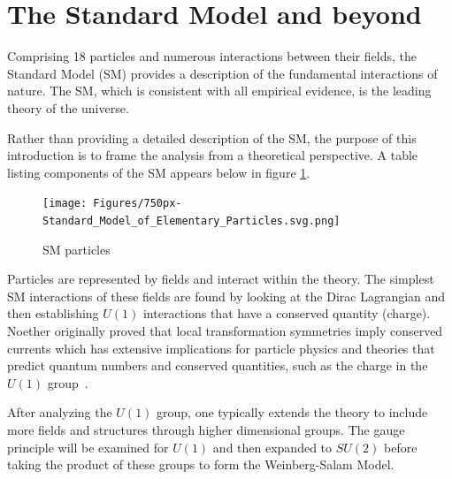\section{The Standard Model and beyond}




Comprising 18 particles and numerous interactions between their fields, the Standard Model (SM) provides a description of the fundamental interactions of nature.
The SM, which is consistent with all empirical evidence, is the leading theory of the universe. 


Rather than providing a detailed description of the SM, the purpose of this introduction is to frame the analysis from a theoretical perspective.
A table listing components of the SM appears below in figure \ref{fig:SM}. 
\begin{figure}[ht!b]
  \centering
  \texttt{[image: Figures/750px-Standard\_Model\_of\_Elementary\_Particles.svg.png]}
  \caption{\label{fig:SM} SM particles }
\end{figure}

Particles are represented by fields and interact within the theory. The simplest SM interactions of these fields are found by looking at the Dirac Lagrangian and then establishing $U(1)$ interactions that have a conserved quantity (charge). 
Noether originally proved that local transformation symmetries imply conserved currents which has extensive implications for particle physics and theories that predict quantum numbers and conserved quantities, such as the charge in the $U(1)$ group~\cite{Noether_1971}. 

After analyzing the $U(1)$ group, one typically extends the theory to include more fields and structures through higher dimensional groups. The gauge principle will be examined for $U(1)$ and then expanded to $SU(2)$ before taking the product of these groups to form the Weinberg-Salam Model.

